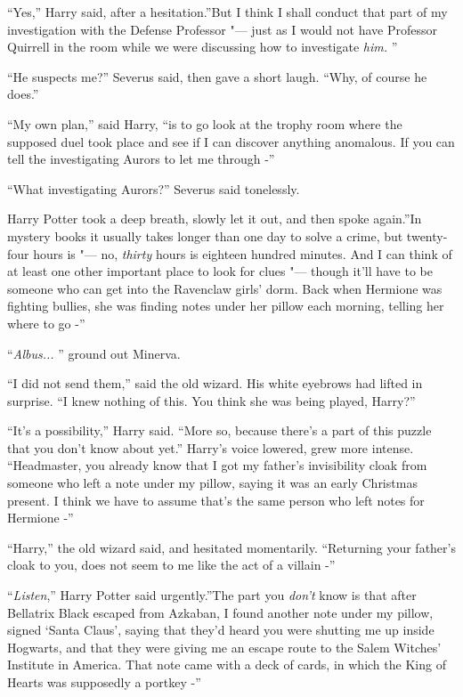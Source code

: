 ``Yes,'' Harry said, after a hesitation.''But I think I shall conduct
that part of my investigation with the Defense Professor "--- just as I
would not have Professor Quirrell in the room while we were discussing
how to investigate \emph{him.} ''

``He suspects me?'' Severus said, then gave a short laugh. ``Why, of
course he does.''

``My own plan,'' said Harry, ``is to go look at the trophy room where
the supposed duel took place and see if I can discover anything
anomalous. If you can tell the investigating Aurors to let me through
-''

``What investigating Aurors?'' Severus said tonelessly.

Harry Potter took a deep breath, slowly let it out, and then spoke
again.''In mystery books it usually takes longer than one day to solve a
crime, but twenty-four hours is "--- no, \emph{thirty} hours is eighteen
hundred minutes. And I can think of at least one other important place
to look for clues "--- though it'll have to be someone who can get into the
Ravenclaw girls' dorm. Back when Hermione was fighting bullies, she was
finding notes under her pillow each morning, telling her where to go -''

``\emph{Albus...} '' ground out Minerva.

``I did not send them,'' said the old wizard. His white eyebrows had
lifted in surprise. ``I knew nothing of this. You think she was being
played, Harry?''

``It's a possibility,'' Harry said. ``More so, because there's a part of
this puzzle that you don't know about yet.'' Harry's voice lowered, grew
more intense. ``Headmaster, you already know that I got my father's
invisibility cloak from someone who left a note under my pillow, saying
it was an early Christmas present. I think we have to assume that's the
same person who left notes for Hermione -''

``Harry,'' the old wizard said, and hesitated momentarily. ``Returning
your father's cloak to you, does not seem to me like the act of a
villain -''

``\emph{Listen},'' Harry Potter said urgently.''The part you \emph{don't}
know is that after Bellatrix Black escaped from Azkaban, I found another
note under my pillow, signed `Santa Claus', saying that they'd heard you
were shutting me up inside Hogwarts, and that they were giving me an
escape route to the Salem Witches' Institute in America. That note came
with a deck of cards, in which the King of Hearts was supposedly a
portkey -''

